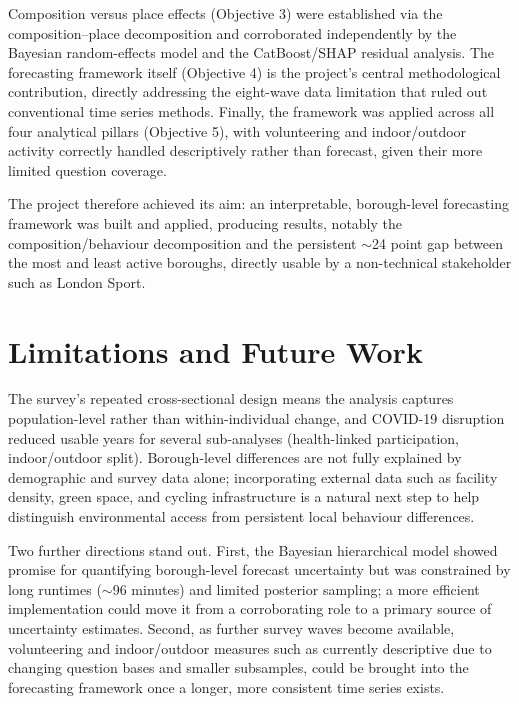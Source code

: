 \documentclass[ %
                    author={Ashrey Ashrey, Sanya Kapoor, Trisha Sharma, Yash Bhooshan Pandloskar},
                supervisor={Dr. Dalila O’Grady},
                    degree={MSc},
                     title={Using machine learning to forecast physical activity participation, volunteering and activity patterns in London},
                  subtitle={},
                      type={},
                      year={2021}]{dissertation}
\begin{document}
Composition versus place effects (Objective 3) were established via the composition--place decomposition and corroborated independently by the Bayesian random-effects model and the CatBoost/SHAP residual analysis. The forecasting framework itself (Objective 4) is the project's central methodological contribution, directly addressing the eight-wave data limitation that ruled out conventional time series methods. Finally, the framework was applied across all four analytical pillars (Objective 5), with volunteering and indoor/outdoor activity correctly handled descriptively rather than forecast, given their more limited question coverage.

The project therefore achieved its aim: an interpretable, borough-level forecasting framework was built and applied, producing results, notably the composition/behaviour decomposition and the persistent $\sim$24 point gap between the most and least active boroughs, directly usable by a non-technical stakeholder such as London Sport.

\section{Limitations and Future Work}

The survey's repeated cross-sectional design means the analysis captures population-level rather than within-individual change, and COVID-19 disruption reduced usable years for several sub-analyses (health-linked participation, indoor/outdoor split). Borough-level differences are not fully explained by demographic and survey data alone; incorporating external data such as facility density, green space, and cycling infrastructure is a natural next step to help distinguish environmental access from persistent local behaviour differences.

Two further directions stand out. First, the Bayesian hierarchical model showed promise for quantifying borough-level forecast uncertainty but was constrained by long runtimes ($\sim$96 minutes) and limited posterior sampling; a more efficient implementation could move it from a corroborating role to a primary source of uncertainty estimates. Second, as further survey waves become available, volunteering and indoor/outdoor measures such as currently descriptive due to changing question bases and smaller subsamples, could be brought into the forecasting framework once a longer, more consistent time series exists.




\end{document}
